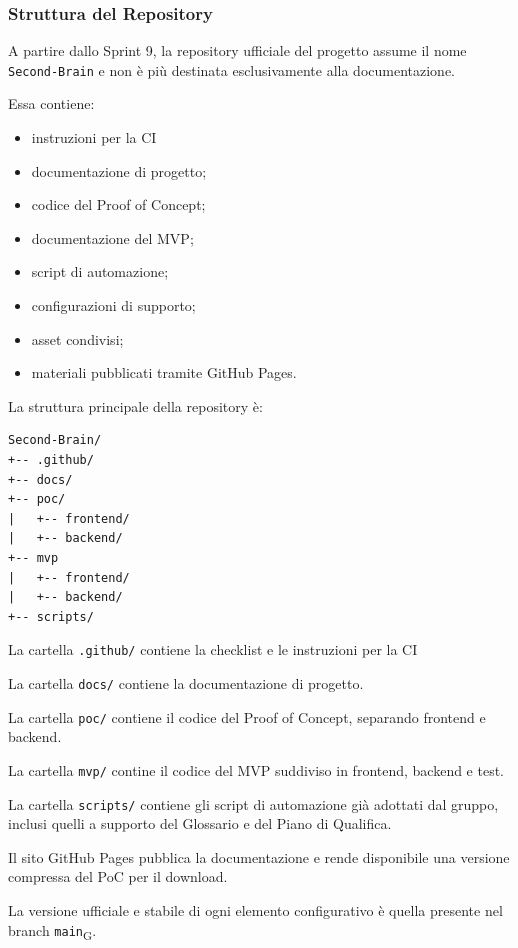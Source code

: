 
\subsubsection{Struttura del Repository}

A partire dallo Sprint 9, la repository ufficiale del progetto assume il nome
\texttt{Second-Brain} e non è più destinata esclusivamente alla documentazione.

Essa contiene:

\begin{itemize}
    \item instruzioni per la CI
    \item documentazione di progetto;
    \item codice del Proof of Concept;
    \item documentazione del MVP;
    \item script di automazione;
    \item configurazioni di supporto;
    \item asset condivisi;
    \item materiali pubblicati tramite GitHub Pages.
\end{itemize}

La struttura principale della repository è:

\begin{verbatim}
Second-Brain/
+-- .github/
+-- docs/
+-- poc/
|   +-- frontend/
|   +-- backend/
+-- mvp
|   +-- frontend/
|   +-- backend/
+-- scripts/
\end{verbatim}

La cartella \texttt{.github/} contiene la checklist e le instruzioni per la CI

La cartella \texttt{docs/} contiene la documentazione di progetto.

La cartella \texttt{poc/} contiene il codice del Proof of Concept, separando
frontend e backend.

La cartella \texttt{mvp/} contine il codice del MVP suddiviso in 
frontend, backend e test.

La cartella \texttt{scripts/} contiene gli script di automazione già adottati dal
gruppo, inclusi quelli a supporto del Glossario e del Piano di Qualifica.

Il sito GitHub Pages pubblica la documentazione e rende disponibile una versione
compressa del PoC per il download.

La versione ufficiale e stabile di ogni elemento configurativo è quella presente
nel branch \texttt{main}\textsubscript{G}.

